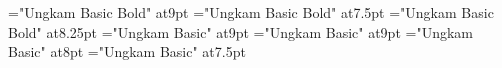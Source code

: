 \font\slnmfont="Ungkam Basic Bold" at9pt
\font\slnmfontx="Ungkam Basic Bold" at7.5pt
\font\slnmfonty="Ungkam Basic Bold" at8.25pt
\font\sldistfont="Ungkam Basic" at9pt
\font\oidfont="Ungkam Basic" at9pt
\font\oidfontx="Ungkam Basic" at8pt
\font\zatufont="Ungkam Basic" at7.5pt

\def\sldist{\sldistfont}

\def\slnamesaunaturel#1#2#3#4#5#6#7#8{%
    \vbox{\slnamesx{#1}{#2}{#3}{#4}{#5}{#6}{#7}{#8}}%
}

\def\slnamesrowht#1#2#3#4#5#6#7#8{%
    \vbox to\pcslrowht{\slnamesx{#1}{#2}{#3}{#4}{#5}{#6}{#7}{#8}}%
}

\newbox\slnmbox
\newtoks\sldistt \newtoks\sldistiv \newtoks\sldistiii
\newbox\sldistbox \newbox\sldisttbox \newbox\sldistivbox \newbox\sldistiiibox

\def\slnamesx#1#2#3#4#5#6#7#8{%
   \setbox\slnmbox=\hbox{#1}\ifdim\wd\slnmbox>2in
     \let\slnm\slnmfontx
     \else
       \ifdim\wd\slnmbox>1.25in
         \let\slnm\slnmfonty
       \else
         \let\slnm\slnmfont
       \fi
     \fi
   \hbox to2in{\slnm#1\hfil#3}%
   \hbox{\hbox to1in{\helvy#5\hfil}\smash{\hbox to.5in{\kern.2in\vbox{\hbox{\pcssXX#4}\kern2pt}\hss}}}%
   \vfil
   \hbox{%
     #7%
     \vbox{\hbox{\hbox to.5in{\kern.05in\oidfont#2\hfil}\hbox to.5in{\hfil\zatufont#6}}}}%
}

\def\sldist{%
   \setbox\sldisttbox\hbox{\the\sldistt}%
   \setbox\sldistivbox\hbox{\the\sldistiv}%
   \setbox\sldistiiibox\hbox{\the\sldistiii}%
   \setbox\sldistbox\hbox{\oidfont\leavevmode IV:\kern2pt}%
   \vbox{\oidfont\hsize1in\parindent0pt\hangindent2em\rightskip0pt plus1fil
         \leavevmode
         \hbox to2em{\the\sldistt\hss}%
         \ifdim\wd\sldisttbox>1.9em\hskip1pt\penalty-10000\fi
         \ifdim\wd\sldistivbox>0pt\oidfontx\hbox{\hbox to\wd\sldistbox{IV:\kern2pt\hfil}\the\sldistiv\hfil}%
           \ifdim\wd\sldistiiibox>0pt; \penalty0\fi
         \fi
         \ifdim\wd\sldistiiibox>0pt\oidfontx\hbox{\hbox to\wd\sldistbox{III:\kern2pt\hfil}\the\sldistiii\hfil}\fi
         \endgraf
   }%
}

\let\sl\relax
\let\slc\relax
\let\slcc\relax
\let\cdligh\relax
\let\zatu\relax
\def\diffc{\let\ofspc\relax\pcfee}
\def\diffd{\hvfee}

\def\includegraphics#1#2{\XeTeXpicfile #1 scaled #2\relax}

\endinput
